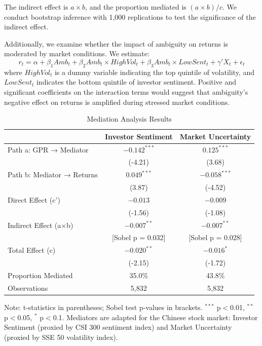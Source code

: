 \documentclass[preprint,12pt,authoryear]{elsarticle}
\begin{document}
The indirect effect is $a \times b$, and the proportion mediated is $(a \times b)/c$. We conduct bootstrap inference with 1,000 replications to test the significance of the indirect effect.

Additionally, we examine whether the impact of ambiguity on returns is moderated by market conditions. We estimate:
\begin{equation}
r_t = \alpha + \beta_1 Amb_t + \beta_2 Amb_t \times HighVol_t + \beta_3 Amb_t \times LowSent_t + \gamma' X_t + \epsilon_t
\end{equation}
where $HighVol_t$ is a dummy variable indicating the top quintile of volatility, and $LowSent_t$ indicates the bottom quintile of investor sentiment. Positive and significant coefficients on the interaction terms would suggest that ambiguity's negative effect on returns is amplified during stressed market conditions.

\begin{table}[htbp]
\centering
\caption{Mediation Analysis Results}
\label{tab:mediation_results}
\begin{tabular}{lcc}
\toprule
 & \multicolumn{1}{c}{Investor Sentiment} & \multicolumn{1}{c}{Market Uncertainty} \\ %
\midrule
Path a: GPR → Mediator & $-0.142^{***}$ & $0.125^{***}$ \\
 & (-4.21) & (3.68) \\
Path b: Mediator → Returns & $0.049^{***}$ & $-0.058^{***}$ \\
 & (3.87) & (-4.52) \\
Direct Effect (c') & $-0.013$ & $-0.009$ \\
 & (-1.56) & (-1.08) \\
Indirect Effect (a×b) & $-0.007^{**}$ & $-0.007^{**}$ \\
 & [Sobel p = 0.032] & [Sobel p = 0.028] \\
Total Effect (c) & $-0.020^{**}$ & $-0.016^{*}$ \\
 & (-2.15) & (-1.72) \\
\midrule
Proportion Mediated & 35.0\% & 43.8\% \\
Observations & 5,832 & 5,832 \\
\bottomrule
\end{tabular}

\vspace{1em} %
\footnotesize
\raggedright %
Note: t-statistics in parentheses; Sobel test p-values in brackets. 
$^{***}$ p$<$0.01, $^{**}$ p$<$0.05, $^{*}$ p$<$0.1. 
Mediators are adapted for the Chinese stock market: Investor Sentiment (proxied by CSI 300 sentiment index) and Market Uncertainty (proxied by SSE 50 volatility index).
\end{table}
\end{document}
